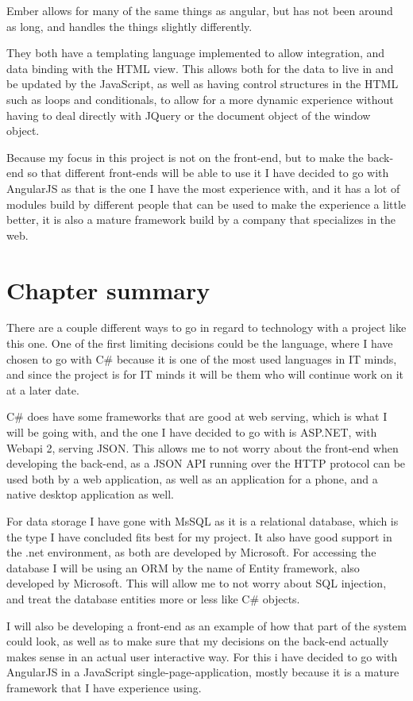 Ember allows for many of the same things as angular, but has not been around as
long, and handles the things slightly differently\cite{emberjs}. 

They both have a templating language implemented to allow integration, and
data binding with the HTML view. This allows both for the data to live in and be
updated by the JavaScript, as well as having control structures in the HTML such
as loops and conditionals, to allow for a more dynamic experience without having
to deal directly with JQuery or the document object of the window object. 

Because my focus in this project is not on the front-end, but to make the back-end
so that different front-ends will be able to use it I have decided to go with
AngularJS as that is the one I have the most experience with, and it has a lot
of modules build by different people that can be used to make the experience a
little better, it is also a mature framework build by a company that specializes
in the web. 

\section{Chapter summary }
There are a couple different ways to go in regard to technology with a project
like this one. One of the first limiting decisions could be the language, where
I have chosen to go with C\# because it is one of the most used languages in IT
minds, and since the project is for IT minds it will be them who will continue
work on it at a later date.

C\# does have some frameworks that are good at web serving, which is what I will
be going with, and the one I have decided to go with is ASP.NET, with Webapi 2,
serving JSON. This allows me to not worry about the front-end when developing the
back-end, as a JSON API running over the HTTP protocol can be used both by a web
application, as well as an application for a phone, and a native desktop
application as well.

For data storage I have gone with MsSQL as it is a relational database, which is
the type I have concluded fits best for my project. It also have good support in
the .net environment, as both are developed by Microsoft. For accessing the
database I will be using an ORM by the name of Entity framework, also developed
by Microsoft. This will allow me to not worry about SQL injection, and treat the
database entities more or less like C\# objects.

I will also be developing a front-end as an example of how that part of the
system could look, as well as to make sure that my decisions on the back-end
actually makes sense in an actual user interactive way. For this i have decided
to go with AngularJS in a JavaScript single-page-application, mostly because it is
a mature framework that I have experience using.
